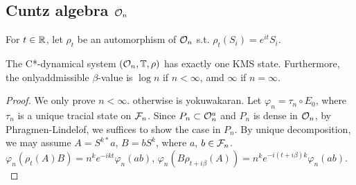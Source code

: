 \subsection{Cuntz algebra $\mathcal{O}_n$}
\cite{olesen1978some}
For $t \in \mathbb{R}$, let $\rho_t$ be an automorphism of $\mathcal{O}_n$ s.t. $\rho_t(S_i) = e^{it}S_i$.

\begin{theorem}
  The C*-dynamical system $(\mathcal{O}_n, \mathbb{T}, \rho)$ has exactly one KMS state. 
  Furthermore, the onlyaddmissible $\beta$-value is $\log n$ if $n < \infty$, amd $\infty$ if $n=\infty$.
\end{theorem}

\begin{proof}
  We only prove $n < \infty$. otherwise is yokuwakaran. 
  Let $\varphi_n = \tau_n \circ E_0$, where $\tau_n$ is a unique tracial state on $\mathcal{F}_n$.
  Since $P_n \subset \mathcal{O}_n^a$ and $P_n$ is dense in $\mathcal{O}_n$, by Phragmen-Lindel$\ddot{o}$f, we suffices to show the case in $P_n$.
  By unique decomposition, we may assume $A=S^{k*}a$, $B = bS^k$, where $a$, $b \in \mathcal{F}_n$. 
  $\varphi_n(\rho_t(A)B) = n^ke^{-ikt}\varphi_n(ab)$,
  $\varphi_n(B\rho_{t+i\beta}(A)) = n^ke^{-i(t+i\beta)k}\varphi_n(ab)$. \\
  
\end{proof}
